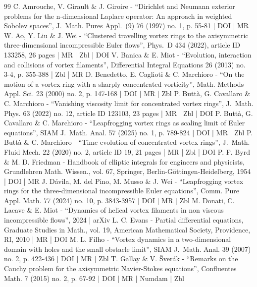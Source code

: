 \begin{thebibliography}{99}
C. Amrouche, V. Girault \& J. Giroire - “Dirichlet and Neumann exterior problems for the n-dimensional Laplace operator: An approach in weighted Sobolev spaces”, J. Math. Pures Appl. (9) 76 (1997) no. 1, p. 55-81 | DOI | MR
W. Ao, Y. Liu \& J. Wei - “Clustered travelling vortex rings to the axisymmetric three-dimensional incompressible Euler flows”, Phys. D 434 (2022), article ID 133258, 26 pages | MR | Zbl | DOI
V. Banica \& E. Miot - “Evolution, interaction and collisions of vortex filaments”, Differential Integral Equations 26 (2013) no. 3-4, p. 355-388 | Zbl | MR
D. Benedetto, E. Caglioti \& C. Marchioro - “On the motion of a vortex ring with a sharply concentrated vorticity”, Math. Methods Appl. Sci. 23 (2000) no. 2, p. 147-168 | DOI | MR | Zbl
P. Buttà, G. Cavallaro \& C. Marchioro - “Vanishing viscosity limit for concentrated vortex rings”, J. Math. Phys. 63 (2022) no. 12, article ID 123103, 23 pages | MR | Zbl | DOI
P. Buttà, G. Cavallaro \& C. Marchioro - “Leapfrogging vortex rings as scaling limit of Euler equations”, SIAM J. Math. Anal. 57 (2025) no. 1, p. 789-824 | DOI | MR | Zbl
P. Buttà \& C. Marchioro - “Time evolution of concentrated vortex rings”, J. Math. Fluid Mech. 22 (2020) no. 2, article ID 19, 21 pages | MR | Zbl | DOI
P. F. Byrd \& M. D. Friedman - Handbook of elliptic integrals for engineers and physicists, Grundlehren Math. Wissen., vol. 67, Springer, Berlin-Göttingen-Heidelberg, 1954 | DOI | MR
J. Dávila, M. del Pino, M. Musso \& J. Wei - “Leapfrogging vortex rings for the three-dimensional incompressible Euler equations”, Comm. Pure Appl. Math. 77 (2024) no. 10, p. 3843-3957 | DOI | MR | Zbl
M. Donati, C. Lacave \& E. Miot - “Dynamics of helical vortex filaments in non viscous incompressible flows”, 2024 | arXiv
L. C. Evans - Partial differential equations, Graduate Studies in Math., vol. 19, American Mathematical Society, Providence, RI, 2010 | MR | DOI
M. L. Filho - “Vortex dynamics in a two-dimensional domain with holes and the small obstacle limit”, SIAM J. Math. Anal. 39 (2007) no. 2, p. 422-436 | DOI | MR | Zbl
T. Gallay \& V. Šverák - “Remarks on the Cauchy problem for the axisymmetric Navier-Stokes equations”, Confluentes Math. 7 (2015) no. 2, p. 67-92 | DOI | MR | Numdam | Zbl

\end{thebibliography}
